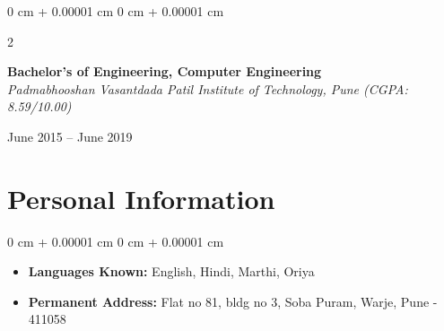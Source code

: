 \documentclass[10pt, letterpaper]{article}
\newenvironment{highlights}{
    \begin{itemize}[
        topsep=0.10 cm,
        parsep=0.10 cm,
        partopsep=0pt,
        itemsep=0pt,
        leftmargin=0 cm + 10pt
    ]
}{
    \end{itemize}
} %
\newenvironment{onecolentry}{
    \begin{adjustwidth}{
        0 cm + 0.00001 cm
    }{
        0 cm + 0.00001 cm
    }
}{
    \end{adjustwidth}
} %
\newenvironment{twocolentry}[2][]{
    \onecolentry
    \def\secondColumn{#2}
    \setcolumnwidth{\fill, 4.5 cm}
    \begin{paracol}{2}
}{
    \switchcolumn \raggedleft \secondColumn
    \end{paracol}
    \endonecolentry
} %
\begin{document}
\vspace{0.2 cm}
\begin{twocolentry}{
    June 2015 – June 2019
}
    \textbf{Bachelor's of Engineering, Computer Engineering} \\
    \textit{Padmabhooshan Vasantdada Patil Institute of Technology, Pune (CGPA: 8.59/10.00)}
\end{twocolentry}

\vspace{0.1 cm}

          \section{Personal Information}
          \begin{onecolentry}
            \begin{highlights}
          \item   \textbf{Languages Known:} English, Hindi, Marthi, Oriya
          \item \textbf{Permanent Address:} Flat no 81, bldg no 3, Soba Puram, Warje, Pune - 411058
          \end{highlights}
          \end{onecolentry}
          
\end{document}
